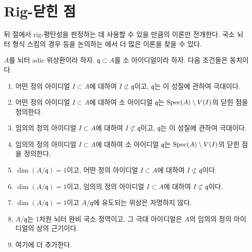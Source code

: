 \section{Rig-닫힌 점}
\label{section-rig-points}

\noindent
뒤 절에서 rig-평탄성을 판정하는 데 사용할 수 있을 만큼의 이론만 전개한다.
국소 뇌터 형식 스킴의 경우 등을 논의하는 \cite{BL-I}에서 더 많은 이론을 찾을 수 있다.

\begin{lemma}
\label{lemma-rig-point}
$A$를 뇌터 adic 위상환이라 하자. $\mathfrak q \subset A$를 소 아이디얼이라 하자.
다음 조건들은 동치이다.
\begin{enumerate}
\item 어떤 정의 아이디얼 $I \subset A$에 대하여
$I \not \subset \mathfrak q$이고, $\mathfrak q$는 이 성질에 관하여 극대이다.
\item 어떤 정의 아이디얼 $I \subset A$에 대하여 소 아이디얼
$\mathfrak q$는 $\mathop{\mathrm{Spec}}(A) \setminus V(I)$의 닫힌 점을 정의한다.
\item 임의의 정의 아이디얼 $I \subset A$에 대하여
$I \not \subset \mathfrak q$이고, $\mathfrak q$는 이 성질에 관하여 극대이다.
\item 임의의 정의 아이디얼 $I \subset A$에 대하여 소 아이디얼
$\mathfrak q$는 $\mathop{\mathrm{Spec}}(A) \setminus V(I)$의 닫힌 점을 정의한다.
\item $\dim(A/\mathfrak q) = 1$이고, 어떤 정의 아이디얼
$I \subset A$에 대하여 $I \not \subset \mathfrak q$이다.
\item $\dim(A/\mathfrak q) = 1$이고, 임의의 정의 아이디얼
$I \subset A$에 대하여 $I \not \subset \mathfrak q$이다.
\item $\dim(A/\mathfrak q) = 1$이고 $A/\mathfrak q$에 유도되는 위상은 자명하지 않다.
\item $A/\mathfrak q$는 $1$차원 뇌터 완비 국소 정역이고,
그 극대 아이디얼은 $A$의 임의의 정의 아이디얼의 상의 근기이다.
\item 여기에 더 추가한다.
\end{enumerate}
\end{lemma}

